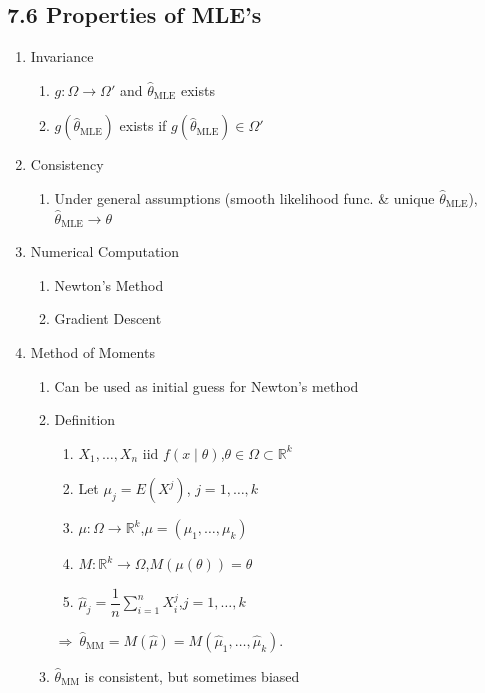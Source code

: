 \documentclass[11pt]{article}
\begin{document}
\subsection*{7.6 Properties of MLE's}
\begin{enumerate}[label=\Roman*.]
  \item Invariance
  \begin{enumerate}[label=\Alph*.]
    \item $g:\Omega\to\Omega'$ and $\hat\theta_{\text{MLE}}$ exists
    \item $g(\hat\theta_{\text{MLE}})$ exists if $g(\hat\theta_{\text{MLE}})\in\Omega'$
  \end{enumerate}
  \item Consistency
  \begin{enumerate}[label=\Alph*.]
    \item Under general assumptions (smooth likelihood func. \& unique $\hat\theta_{\text{MLE}}$), $\hat\theta_{\text{MLE}}\to\theta$
  \end{enumerate}
  \item Numerical Computation
  \begin{enumerate}[label=\Alph*.]
    \item Newton's Method
    \item Gradient Descent
  \end{enumerate}
  \item Method of Moments
  \begin{enumerate}[label=\Alph*.]
    \item Can be used as initial guess for Newton's method
    \item Definition
    \begin{enumerate}[label=\arabic*.]
      \item $X_{1},\dots,X_{n}$ iid $f(x\mid\theta)$,\quad $\theta\in\Omega\subset\mathbb{R}^{k}$
      \item Let $\mu_{j}=E(X^{j})$, $j=1,\dots,k$
      \item $\mu:\Omega\to\mathbb{R}^{k}$,\quad $\mu=(\mu_{1},\dots,\mu_{k})$
      \item $M:\mathbb{R}^{k}\to\Omega$,\quad $M(\mu(\theta))=\theta$
      \item $\hat\mu_{j}=\dfrac{1}{n}\sum_{i=1}^{n}X_{i}^{j}$,\quad $j=1,\dots,k$
    \end{enumerate}
    $\Rightarrow\ \hat\theta_{\text{MM}}=M(\hat\mu)=M(\hat\mu_{1},\dots,\hat\mu_{k})$.
    \item $\hat\theta_{\text{MM}}$ is consistent, but sometimes biased
  \end{enumerate}
\end{enumerate}
\end{document}
